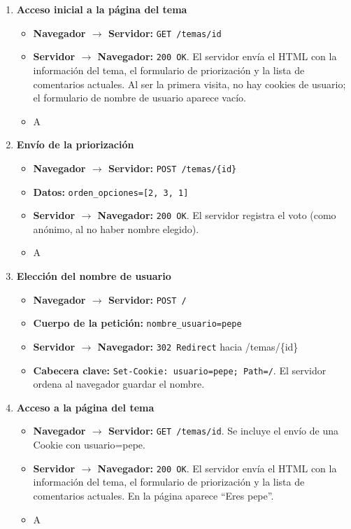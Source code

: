 \begin{enumerate}
  \item \textbf{Acceso inicial a la página del tema}
  \begin{itemize}\item \textbf{Navegador $\rightarrow$ Servidor:} \texttt{GET /temas/{id}}
    \item \textbf{Servidor $\rightarrow$ Navegador:} \texttt{200 OK}. El servidor envía el HTML con la información del tema, el formulario de priorización y la lista de comentarios actuales. Al ser la primera visita, no hay cookies de usuario; el formulario de nombre de usuario aparece vacío.
    \item \textcircled{A}
  \end{itemize}

  \item \textbf{Envío de la priorización}
  \begin{itemize}
    \item \textbf{Navegador $\rightarrow$ Servidor:} \texttt{POST /temas/\{id\}}
    \item \textbf{Datos:} \texttt{orden\_opciones=[2, 3, 1]}
    \item \textbf{Servidor $\rightarrow$ Navegador:} \texttt{200 OK}. El servidor registra el voto (como anónimo, al no haber nombre elegido).
    \item \textcircled{A}
  \end{itemize}

  \item \textbf{Elección del nombre de usuario}
  \begin{itemize}
     \item \textbf{Navegador $\rightarrow$ Servidor:} \texttt{POST /}
    \item \textbf{Cuerpo de la petición:} \texttt{nombre\_usuario=pepe}
    \item \textbf{Servidor $\rightarrow$ Navegador:} \texttt{302 Redirect} hacia /temas/\{id\}
    \item \textbf{Cabecera clave:} \texttt{Set-Cookie: usuario=pepe; Path=/}. El servidor ordena al navegador guardar el nombre.
      \end{itemize}

  \item \textbf{Acceso a la página del tema}
  \begin{itemize}
    \item \textbf{Navegador $\rightarrow$ Servidor:} \texttt{GET /temas/{id}}. Se incluye el envío de una Cookie con usuario=pepe.
    \item \textbf{Servidor $\rightarrow$ Navegador:} \texttt{200 OK}. El servidor envía el HTML con la información del tema, el formulario de priorización y la lista de comentarios actuales. En la página aparece ``Eres pepe''.
    \item \textcircled{A}
  \end{itemize}


\end{enumerate}
